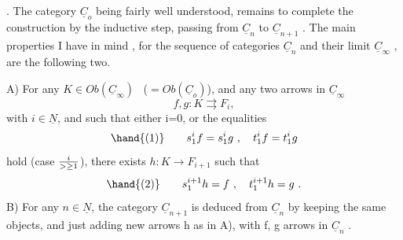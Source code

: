 . The category $\underline{C}_o$ being fairly well understood,  remains to complete
the construction by the inductive step,  passing from $\underline{C}_n$ to $\underline{C}_{n+1}$ . The
main properties I have in mind  , for the sequence of categories
$\underline{C}_n$ and their limit $\underline{C}_\infty$ , are the following two.

A) For any $K\in Ob(\underline{C}_\infty)$ \ ($= Ob(\underline{C}_o)$), and any two arrows in $\underline{C}_\infty$
\[ f,g : K \rightrightarrows F_i , \]
with $i\in\underline{N}$, \hand{(}and such that either i=0, or the equalities
\[ \hand{(1)}\qquad s_1^i f = s_1^i g \ , \quad t_1^i f = t_1^i g \]
hold (case $i \over{>}{\geq} 1$), there exists $h: K\to F_{i+1}$ such that
\[ \hand{(2)}\qquad s_1^{i+1} h = f \ , \quad t_1^{i+1} h = g \ . \]
B) For any $n\in\underline{N}$, the category $\underline{C}_{n+1}$ is deduced from $\underline{C}_n$ by keeping
the same objects, and just adding new arrows  h as in A), with
f, g arrows in $\underline{C}_n$ .


